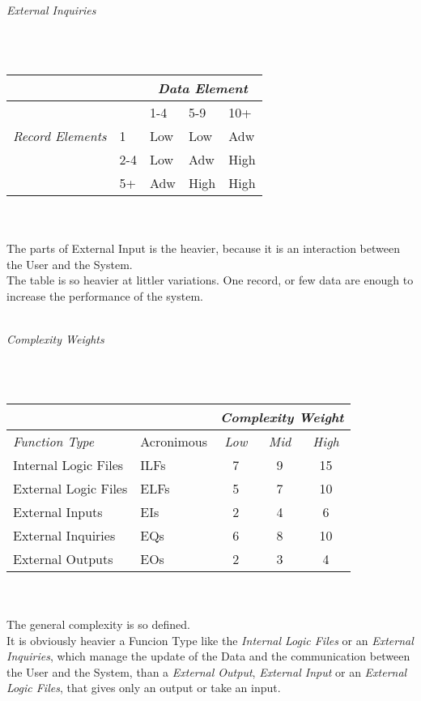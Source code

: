 \documentclass[11pt,a4paper]{report}
\begin{document}
\\\\
\centerline{\textit{External Inquiries}}
\\\\
\begin{tabularx}{\textwidth}{|X|X|X|X|X|}
	\hline
	\multicolumn{2}{|X|}{} & \multicolumn{3}{|c|}{\textit{Data Element}}\\
	\hline
	\multirow{3}{*}{\textit{Record Elements}} & & 1-4 & 5-9 & 10+\\
	\hline
	& 1 & Low & Low & Adw\\
	& 2-4 & Low & Adw & High\\
	& 5+ & Adw & High & High\\
	\hline
\end{tabularx}
\\\\
The parts of External Input is the heavier, because it is an interaction between the User and the System.\\
The table is so heavier at littler variations. One record, or few data are enough to increase the performance of the system. 
\\\\
\centerline{\textit{Complexity Weights}}
\\\\
\begin{tabularx}{\textwidth}{|X|l|c|c|c|}
	\hline
	\multicolumn{2}{|X|}{} & \multicolumn{3}{X|}{\textit{Complexity Weight}}\\
	\hline
	\textit{Function Type} & Acronimous & \textit{Low} & \textit{Mid} & \textit{High}\\
	\hline
	Internal Logic Files & ILFs & 7 & 9 & 15\\
	External Logic Files & ELFs & 5 & 7 & 10\\
	External Inputs & EIs & 2 & 4 & 6\\
	External Inquiries & EQs & 6 & 8 & 10\\
	External Outputs & EOs & 2 & 3 & 4\\
	\hline
\end{tabularx}
\\\\
The general complexity is so defined.\\
It is obviously heavier a Funcion Type like the \textit{Internal Logic Files} or an \textit{External Inquiries}, which manage the update of the Data and the communication between the User and the System, than a \textit{External Output}, \textit{External Input} or an \textit{External Logic Files}, that gives only an output or take an input.\\
\end{document}
